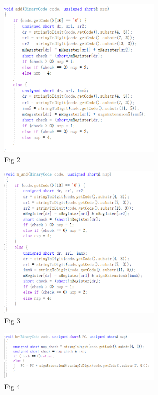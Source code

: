 \documentclass[twoside]{article}
\begin{document}
\begin{CJK*}{UTF8}{gbsn}
	
	
	\begin{figure}[htbp]
		\small
		\centering
		\includegraphics[width=0.7\textwidth]{add.png}
		\caption{Fig 2} %
	\end{figure}


	\begin{figure}[htbp]
		\small
		\centering
		\includegraphics[width=0.7\textwidth]{and.png}
		\caption{Fig 3} %
	\end{figure}


	\begin{figure}[htbp]
		\small
		\centering
		\includegraphics[width=0.7\textwidth]{br.png}
		\caption{Fig 4} %
	\end{figure}


\end{CJK*}
\end{document}
